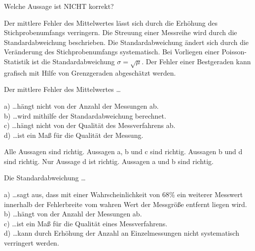 \documentclass[11pt]{exam}
\begin{document}
\setlength{\voffset}{-0.5in}
\setlength{\headsep}{5pt}

\hspace{2mm}
 \hspace{5mm}
\vspace{4mm}

\begin{questions}


\question Welche Aussage ist NICHT korrekt? \\

\begin{choices}
	\choice Der mittlere Fehler des Mittelwertes lässt sich durch die Erhöhung des Stichprobenumfangs verringern.
	\choice Die Streuung einer Messreihe wird durch die Standardabweichung beschrieben.
	\choice Die Standardabweichung ändert sich durch die Veränderung des Stichprobenumfangs systematisch.
	\choice Bei Vorliegen einer Poisson-Statistik ist die Standardabweichung \( \sigma = \sqrt{\mu} \).
	\choice Der Fehler einer Bestgeraden kann grafisch mit Hilfe von Grenzgeraden abgeschätzt werden.
\end{choices}

\vspace{12mm}\question Der mittlere Fehler des Mittelwertes \dots

a) \dots hängt nicht von der Anzahl der Messungen ab. \\
b) \dots wird mithilfe der Standardabweichung berechnet.\\
c) \dots hängt nicht von der Qualität des Messverfahrens ab.\\
d) \dots ist ein Maß für die Qualität der Messung.\\


\begin{choices}
	\choice Alle Aussagen sind richtig.
	\choice Aussagen a, b und c sind richtig.
	\choice Aussagen b und d sind richtig.
	\choice Nur Aussage d ist richtig.
	\choice Aussagen a und b sind richtig.
\end{choices}

\vspace{12mm}\question Die Standardabweichung \dots 

a) \dots sagt aus, dass mit einer Wahrscheinlichkeit von 68\% ein weiterer Messwert innerhalb der Fehlerbreite vom wahren Wert der Messgröße entfernt liegen wird. \\
b) \dots hängt von der Anzahl der Messungen ab. \\
c) \dots ist ein Maß für die Qualität eines Messverfahrens. \\
d) \dots kann durch Erhöhung der Anzahl an Einzelmessungen nicht systematisch verringert werden.\\


\end{questions}
\end{document}
